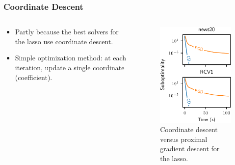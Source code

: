 \documentclass[10pt,aspectratio=169]{beamer}
\begin{document}
\begin{frame}
  \frametitle{Coordinate Descent}

  \begin{columns}[c]
    \begin{column}{0.45\textwidth}
      \begin{itemize}
        \item<1-> Partly because the best solvers for the lasso use coordinate descent.
        \item<2-> Simple optimization method: at each iteration, update a single coordinate (coefficient).
      \end{itemize}
    \end{column}
    \begin{column}{0.45\textwidth}
      \begin{figure}[htpb]
        \centering
        \includegraphics[]{figures/cd-vs-pgd.pdf}
        \caption{%
          Coordinate descent versus proximal gradient descent for the lasso.
        }
      \end{figure}
    \end{column}
  \end{columns}
\end{frame}
\end{document}
